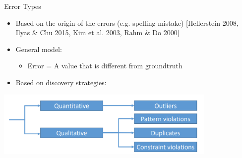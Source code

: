 \documentclass[aspectratio=169]{../latex_main/tntbeamer}  %
\begin{document}
\begin{frame}{Error Types}
    \begin{itemize}
        \item Based on the origin of the errors (e.g. spelling mistake) [Hellerstein 2008, Ilyas \& Chu 2015, Kim et al. 2003, Rahm \& Do 2000]
        \item General model: 
        \begin{itemize}
            \item Error = A value that is different from groundtruth
        \end{itemize}
        \item Based on discovery strategies:
    \end{itemize}

    \centering
\includegraphics[width=0.8\textwidth]{figure/bild16_class_error.png}
    
\end{frame}
\end{document}
